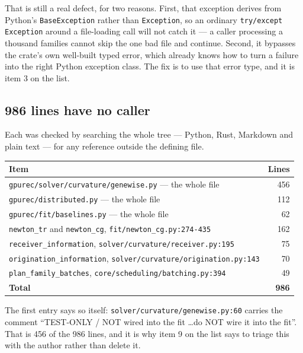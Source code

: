 \documentclass[11pt]{article}
\newcommand{\loc}[1]{\nolinkurl{#1}}
\newcommand{\dir}[1]{\nolinkurl{#1}}
\begin{document}
That is still a real defect, for two reasons.  First, that exception derives
from Python's \texttt{BaseException} rather than \texttt{Exception}, so an
ordinary \texttt{try/except Exception} around a file-loading call will not catch
it --- a caller processing a thousand families cannot skip the one bad file and
continue.  Second, it bypasses the crate's own well-built typed error, which
already knows how to turn a failure into the right Python exception class.  The
fix is to use that error type, and it is item 3 on the list.

\subsection{986 lines have no caller}
\label{sec:dead-code}

Each was checked by searching the whole tree --- Python, Rust, Markdown and
plain text --- for any reference outside the defining file.

\begin{center}
\begin{tabular}{@{}lr@{}}
\toprule
Item & Lines \\
\midrule
\dir{gpurec/solver/curvature/genewise.py} --- the whole file & 456 \\
\dir{gpurec/distributed.py} --- the whole file               & 112 \\
\dir{gpurec/fit/baselines.py} --- the whole file             &  62 \\
\texttt{newton\_tr} and \texttt{newton\_cg}, \loc{fit/newton\_cg.py:274-435} & 162 \\
\texttt{receiver\_information}, \loc{solver/curvature/receiver.py:195}       &  75 \\
\texttt{origination\_information}, \loc{solver/curvature/origination.py:143} &  70 \\
\texttt{plan\_family\_batches}, \loc{core/scheduling/batching.py:394}        &  49 \\
\midrule
\textbf{Total} & \textbf{986} \\
\bottomrule
\end{tabular}
\end{center}

The first entry says so itself: \loc{solver/curvature/genewise.py:60} carries
the comment ``TEST-ONLY / NOT wired into the fit \ldots do NOT wire it into the
fit''.  That is 456 of the 986 lines, and it is why item 9 on the list says to
triage this with the author rather than delete it.
\end{document}
